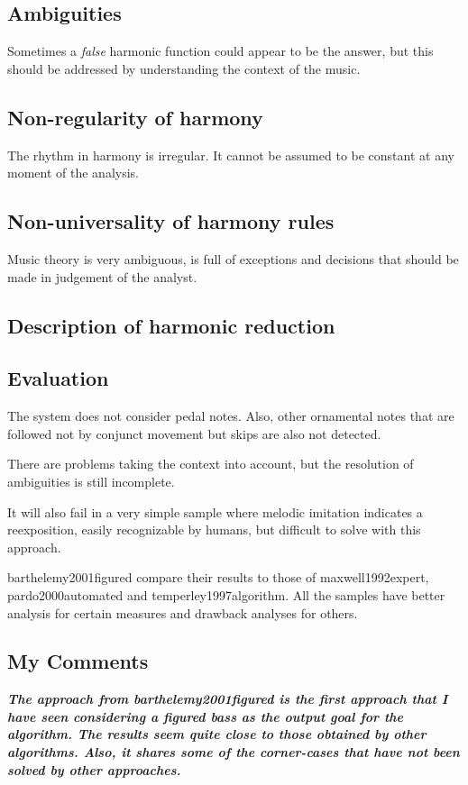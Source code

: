\subsection{Ambiguities}
    Sometimes a \emph{false} harmonic function could appear to be the answer, but this should be addressed by understanding the context of the music.
\subsection{Non-regularity of harmony}
    The rhythm in harmony is irregular. It cannot be assumed to be constant at any moment of the analysis.
\subsection{Non-universality of harmony rules}
    Music theory is very ambiguous, is full of exceptions and decisions that should be made in judgement of the analyst.
\subsection{Description of harmonic reduction}
\subsection{Evaluation}
  The system does not consider pedal notes. Also, other ornamental notes that are followed not by conjunct movement but skips are also not detected.

  There are problems taking the context into account, but the resolution of ambiguities is still incomplete.

  It will also fail in a very simple sample where melodic imitation indicates a reexposition, easily recognizable by humans, but difficult to solve with this approach.

  barthelemy2001figured compare their results to those of maxwell1992expert, pardo2000automated and temperley1997algorithm. All the samples have better analysis for certain measures and drawback analyses for others.
\subsection{My Comments}
  \emph{\textbf{
    The approach from barthelemy2001figured is the first approach that I have seen considering a figured bass as the output goal for the algorithm. The results seem quite close to those obtained by other algorithms. Also, it shares some of the corner-cases that have not been solved by other approaches.
  }}

